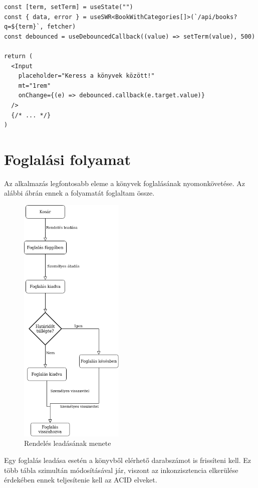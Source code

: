 \begin{lstlisting}[caption=A keresést megvalósító kódrészlet a frontenden]
const [term, setTerm] = useState("")
const { data, error } = useSWR<BookWithCategories[]>(`/api/books?q=${term}`, fetcher)
const debounced = useDebouncedCallback((value) => setTerm(value), 500)

return (
  <Input
    placeholder="Keress a könyvek között!"
    mt="1rem"
    onChange={(e) => debounced.callback(e.target.value)}
  />
  {/* ... */}
)
\end{lstlisting}

\section{Foglalási folyamat}

Az alkalmazás legfontosabb eleme a könyvek foglalásának nyomonkövetése. Az alábbi ábrán ennek a folyamatát foglaltam össze.

\begin{figure}[!ht]
  \centering
  \includegraphics[width=50mm, keepaspectratio]{figures/order-flowchart.png}
  \caption{Rendelés leadásának menete}
  \label{fig:OrderChart}
\end{figure}

Egy foglalás leadása esetén a könyvből elérhető darabszámot is frissíteni kell. Ez több tábla szimultán módosításával jár,
viszont az inkonzisztencia elkerülése érdekében ennek teljesítenie kell az ACID elveket.

